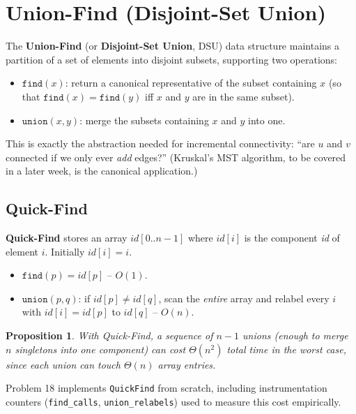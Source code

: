 \documentclass[11pt]{article}
\newtheorem{proposition}[theorem]{Proposition}
\begin{document}
\section{Union-Find (Disjoint-Set Union)}

The \textbf{Union-Find} (or \textbf{Disjoint-Set Union}, DSU) data structure maintains a
partition of a set of elements into disjoint subsets, supporting two operations:

\begin{itemize}
    \item $\texttt{find}(x)$: return a canonical representative of the subset containing
    $x$ (so that $\texttt{find}(x) = \texttt{find}(y)$ iff $x$ and $y$ are in the same
    subset).
    \item $\texttt{union}(x,y)$: merge the subsets containing $x$ and $y$ into one.
\end{itemize}

This is exactly the abstraction needed for incremental connectivity: ``are $u$ and $v$
connected if we only ever \emph{add} edges?'' (Kruskal's MST algorithm, to be covered in a
later week, is the canonical application.)

\subsection{Quick-Find}

\textbf{Quick-Find} stores an array $id[0..n-1]$ where $id[i]$ is the component
\emph{id} of element $i$. Initially $id[i] = i$.

\begin{itemize}
    \item $\texttt{find}(p) = id[p]$ -- $O(1)$.
    \item $\texttt{union}(p,q)$: if $id[p] \ne id[q]$, scan the \emph{entire} array and
    relabel every $i$ with $id[i] = id[p]$ to $id[q]$ -- $O(n)$.
\end{itemize}

\begin{proposition}
With Quick-Find, a sequence of $n-1$ unions (enough to merge $n$ singletons into one
component) can cost $\Theta(n^2)$ total time in the worst case, since each union can touch
$\Theta(n)$ array entries.
\end{proposition}

Problem 18 implements \texttt{QuickFind} from scratch, including instrumentation counters
(\texttt{find\_calls}, \texttt{union\_relabels}) used to measure this cost empirically.
\end{document}
